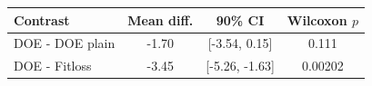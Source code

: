 \begin{tabular}{lccc}
\toprule
Contrast & Mean diff. & 90\% CI & Wilcoxon $p$ \\
\midrule
DOE - DOE plain & -1.70 & [-3.54, 0.15] & 0.111 \\
DOE - Fitloss & -3.45 & [-5.26, -1.63] & 0.00202 \\
\bottomrule
\end{tabular}
